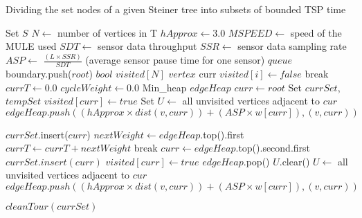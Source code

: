 \begin{algorithm}
\caption{Dividing the set nodes of a given Steiner tree into subsets of bounded TSP time}\label{euclid}
\begin{algorithmic}
\State Set  $S$
\State $N \gets$ number of vertices in T
\State $hApprox \gets 3.0$
\State $MSPEED \gets$ speed of the MULE used
\State $SDT \gets$ sensor data throughput
\State $SSR \gets$ sensor data sampling rate
\State $ASP \gets$ $\frac{(L\times SSR)}{SDT}$ (average sensor pause time for one sensor)
\State $queue$ boundary.push($root$) 
\State $bool$ $visited[N]$
\State $vertex$ curr 
	\State $visited[i] \gets false$ 
\EndFor
{}
		\State break
	\EndIf
	\State $currT \gets 0.0$ 
	\State $cycleWeight \gets 0.0$ 
	\State Min\_heap $edgeHeap$  
	\State $curr \gets root$ 
	\State Set $currSet$, $tempSet$ 
	\State $visited[curr] \gets true$ 
	\State Set $U \gets$ all unvisited vertices adjacent to $cur$ 
		\State $edgeHeap.push((hApprox \times dist(v,curr)) + (ASP\times w[curr]) , (v,curr))$ 
	\EndFor

	\State $currSet$.insert($curr$) 
		\State $nextWeight \gets edgeHeap$.top().first 
		\State $currT \gets currT + nextWeight$ 
			break 
		\EndIf
		\State $curr \gets edgeHeap$.top().second.first 
		\State $currSet.insert(curr)$ 
		\State $visited[curr] \gets true$ 
		\State $edgeHeap$.pop() 
		\State $U$.clear() 
		\State $U \gets$ all unvisited vertices adjacent to $cur$ 
			\State $edgeHeap.push((hApprox \times dist(v,curr)) + (ASP\times w[curr]) , (v,curr))$ 
		\EndFor
	\EndWhile

	\State $cleanTour(currSet)$
\end{algorithmic}
\end{algorithm}

